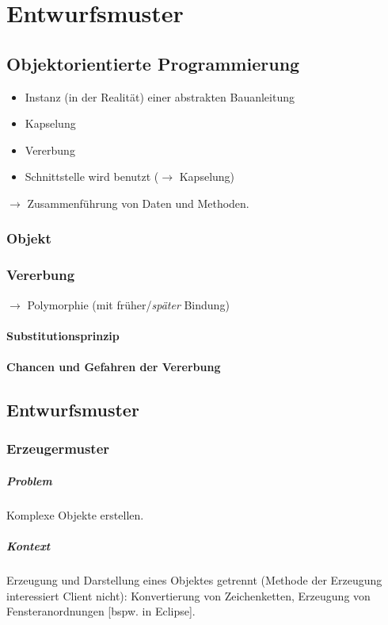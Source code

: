 \documentclass{scrreprt}
\begin{document}
\chapter{Entwurfsmuster}
\section{Objektorientierte Programmierung}
\begin{itemize}
\item Instanz (in der Realität) einer abstrakten Bauanleitung
\item Kapselung
\item Vererbung
\item Schnittstelle wird benutzt ($\to$ Kapselung)
\end{itemize}
$\to$ Zusammenführung von Daten und Methoden.
\subsection{Objekt}
\subsection{Vererbung}
$\to$ Polymorphie (mit früher/\emph{später} Bindung)
\subsubsection{Substitutionsprinzip}
\subsubsection{Chancen und Gefahren der Vererbung}

\section{Entwurfsmuster}
\subsection{Erzeugermuster}
\paragraph{Problem} Komplexe Objekte erstellen. 
\paragraph{Kontext} Erzeugung und Darstellung eines Objektes getrennt (Methode der Erzeugung interessiert Client nicht): Konvertierung von Zeichenketten, Erzeugung von Fensteranordnungen [bspw. in Eclipse].
\end{document}
